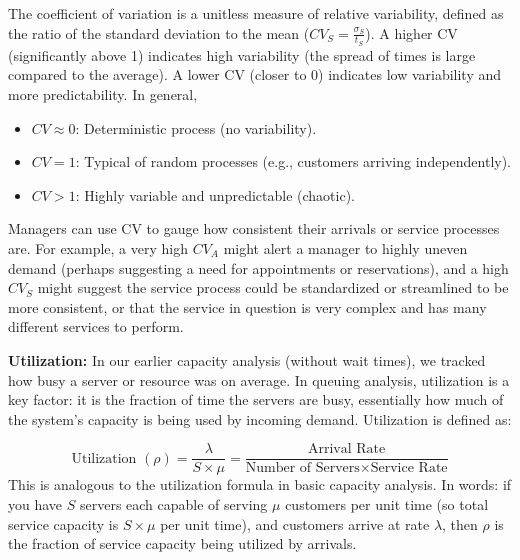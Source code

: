 \documentclass[
  letterpaper,
  DIV=11,
  numbers=noendperiod]{scrartcl}
\begin{document}
\begin{tcolorbox}[enhanced jigsaw, colbacktitle=quarto-callout-important-color!10!white, leftrule=.75mm, breakable, bottomtitle=1mm, title=\textcolor{quarto-callout-important-color}{\faExclamation}\hspace{0.5em}{A note on the coefficient of variation (CV)}, opacitybacktitle=0.6, toptitle=1mm, arc=.35mm, colback=white, rightrule=.15mm, left=2mm, colframe=quarto-callout-important-color-frame, titlerule=0mm, toprule=.15mm, bottomrule=.15mm, opacityback=0, coltitle=black]

The coefficient of variation is a unitless measure of relative
variability, defined as the ratio of the standard deviation to the mean
(\(CV_S = \frac{\sigma_S}{t_S}\)). A higher CV (significantly above 1)
indicates high variability (the spread of times is large compared to the
average). A lower CV (closer to 0) indicates low variability and more
predictability. In general,

\begin{itemize}
\item
  \(CV \approx 0\): Deterministic process (no variability).
\item
  \(CV = 1\): Typical of random processes (e.g., customers arriving
  independently).
\item
  \(CV > 1\): Highly variable and unpredictable (chaotic).
\end{itemize}

Managers can use CV to gauge how consistent their arrivals or service
processes are. For example, a very high \(CV_A\) might alert a manager
to highly uneven demand (perhaps suggesting a need for appointments or
reservations), and a high \(CV_S\) might suggest the service process
could be standardized or streamlined to be more consistent, or that the
service in question is very complex and has many different services to
perform.

\end{tcolorbox}

\textbf{Utilization:} In our earlier capacity analysis (without wait
times), we tracked how busy a server or resource was on average. In
queuing analysis, utilization is a key factor: it is the fraction of
time the servers are busy, essentially how much of the system's capacity
is being used by incoming demand. Utilization is defined as:

\[\text{Utilization } (\rho)= \frac{\lambda}{S\times \mu}=\frac{\text{Arrival Rate}}{\text{Number of Servers}\times\text{Service Rate}}\]
This is analogous to the utilization formula in basic capacity analysis.
In words: if you have \(S\) servers each capable of serving \(\mu\)
customers per unit time (so total service capacity is \(S \times \mu\)
per unit time), and customers arrive at rate \(\lambda\), then \(\rho\)
is the fraction of service capacity being utilized by arrivals.
\end{document}
